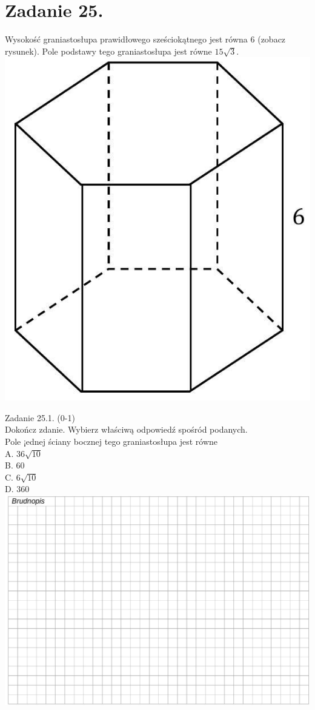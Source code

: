 \documentclass[10pt]{article}
\begin{document}
\section*{Zadanie 25.}
Wysokość graniastosłupa prawidłowego sześciokątnego jest równa 6 (zobacz rysunek). Pole podstawy tego graniastosłupa jest równe \(15 \sqrt{3}\).\\
\includegraphics[max width=\textwidth, center]{2024_11_21_daeb5e5efb43dd4cb535g-22}

Zadanie 25.1. (0-1)\\
Dokończ zdanie. Wybierz właściwą odpowiedź spośród podanych.\\
Pole ¡ednej ściany bocznej tego graniastosłupa jest równe\\
A. \(36 \sqrt{10}\)\\
B. 60\\
C. \(6 \sqrt{10}\)\\
D. 360\\
\includegraphics[max width=\textwidth, center]{2024_11_21_daeb5e5efb43dd4cb535g-22(1)}
\end{document}
